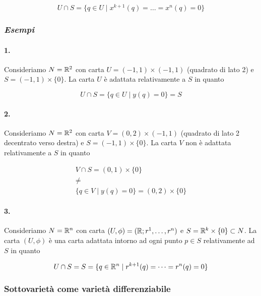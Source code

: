 \begin{equation}
	U \cap S = \{ q \in U \mid x^{k+1}(q) = \dots = x^{n}(q) = 0 \}
\end{equation}

\subsubsection{\textit{Esempi}}

\paragraph{1.}

Consideriamo $ N = \mathbb{R}^{2} $ con carta $ U = (-1,1) \times (-1,1) $ (quadrato di lato 2) e $ S = (-1,1) \times \{0\} $. La carta $ U $ è adattata relativamente a $ S $ in quanto

\begin{equation}
	U \cap S = \{ q \in U \mid y(q) = 0 \} = S
\end{equation}

\paragraph{2.}

Consideriamo $ N = \mathbb{R}^{2} $ con carta $ V = (0,2) \times (-1,1) $ (quadrato di lato 2 decentrato verso destra) e $ S = (-1,1) \times \{0\} $. La carta $ V $ non è adattata relativamente a $ S $ in quanto

\begin{gather}
	V \cap S = (0,1) \times \{0\}\nonumber\\
	\neq\\
	\{ q \in V \mid y(q) = 0 \} = (0,2) \times \{0\}\nonumber
\end{gather}

\paragraph{3.}

Consideriamo $ N = \mathbb{R}^{n} $ con carta $ (U,\phi) = (\mathbb{R};r^{1},\dots,r^{n}) $ e $ S = \mathbb{R}^{k} \times \{0\} \subset N $. La carta $ (U,\phi) $ è una carta adattata intorno ad ogni punto $ p \in S $ relativamente ad $ S $ in quanto

\begin{equation}
	U \cap S = S = \{ q \in \mathbb{R}^{n} \mid r^{k+1}(q) = \dots = r^{n}(q) = 0 \}
\end{equation}

\subsubsection{Sottovarietà come varietà differenziabile}


